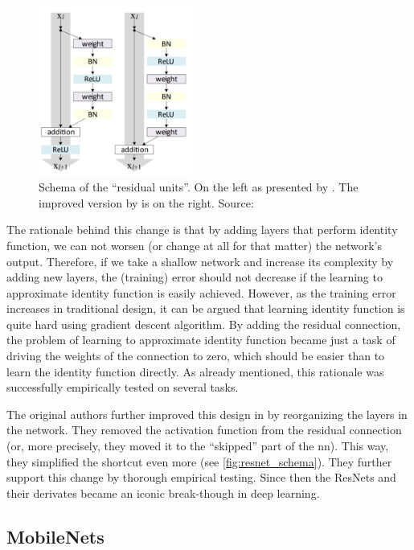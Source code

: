\begin{figure}
    \centering
    \includegraphics[width=0.45\textwidth]{img/resnetv2.png}
    \caption[Residual units]{Schema of the ``residual units''. On the left as presented by \cite{resnet}. The improved version by \cite{resnetimp} is on the right. Source: \cite{resnetimp}}
    \label{fig:resnet_schema}
\end{figure}

The rationale behind this change is that by adding layers that perform identity function, we can not worsen (or change at all for that matter) the network's output. Therefore, if we take a shallow network and increase its complexity by adding new layers, the (training) error should not decrease if the learning to approximate identity function is easily achieved. However, as the training error increases in traditional design, it can be argued that learning identity function is quite hard using gradient descent algorithm. By adding the residual connection, the problem of learning to approximate identity function became just a task of driving the weights of the connection to zero, which should be easier than to learn the identity function directly. As already mentioned, this rationale was successfully empirically tested on several tasks.

The original authors further improved this design in \cite{resnetimp} by reorganizing the layers in the network. They removed the activation function from the residual connection (or, more precisely, they moved it to the ``skipped'' part of the \gls{nn}). This way, they simplified the shortcut even more (see \autoref{fig:resnet_schema}). They further support this change by thorough empirical testing. Since then the ResNets and their derivates became an iconic break-though in deep learning.

\subsection{MobileNets}

